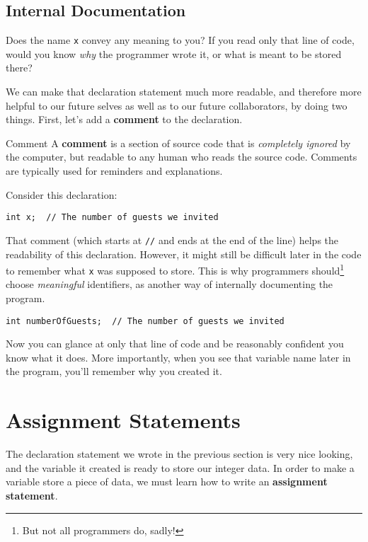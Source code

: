 \subsection{Internal Documentation}

Does the name \texttt{x} convey any meaning to you?  If you read only that line of code, would you know \textit{why} the programmer wrote it, or what is meant to be stored there?

We can make that declaration statement much more readable, and therefore more helpful to our future selves as well as to our future collaborators, by doing two things.  First, let's add a \textbf{comment} to the declaration.

\begin{defn}{Comment}
A \textbf{comment} is a section of source code that is \textit{completely ignored} by the computer, but readable to any human who reads the source code.  Comments are typically used for reminders and explanations.
\end{defn}

Consider this declaration:

\begin{verbatim}
int x;  // The number of guests we invited
\end{verbatim}

That comment (which starts at \lstinline{//} and ends at the end of the line) helps the readability of this declaration.  However, it might still be difficult later in the code to remember what \lstinline{x} was supposed to store.  This is why programmers should\footnote{But not all programmers do, sadly!} choose \textit{meaningful} identifiers, as another way of internally documenting the program.

\begin{verbatim}
int numberOfGuests;  // The number of guests we invited
\end{verbatim}

Now you can glance at only that line of code and be reasonably confident you know what it does.  More importantly, when you see that variable name later in the program, you'll remember why you created it.

\section{Assignment Statements}

The declaration statement we wrote in the previous section is very nice looking, and the variable it created is ready to store our integer data.  In order to make a variable store a piece of data, we must learn how to write an \textbf{assignment statement}.

